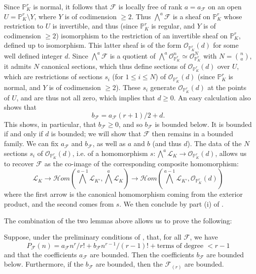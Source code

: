 \begin{cproof}
      Since $\mathbb{P}_K^r$ is normal, it follows that $\mathcal{F}$ is locally free of rank $a=a_\mathcal{F}$ on an open $U=\mathbb{P}_K^r\setminus Y$, where $Y$ is of codimension $\geqslant2$.
      Thus $\bigwedge^a\mathcal{F}$ is a sheaf on $\mathbb{P}_K^r$ whose restriction to $U$ is invertible, and thus (since $\mathbb{P}_K^r$ is regular, and $Y$ is of codimension $\geqslant2$) isomorphism to the restriction of an invertible sheaf on $\mathbb{P}_K^r$, defined up to isomorphism.
      This latter sheaf is of the form $\mathcal{O}_{\mathbb{P}_K^r}(d)$ for some well defined integer $d$.
      Since $\bigwedge^a\mathcal{F}$ is a quotient of $\bigwedge^a\mathcal{O}_{\mathbb{P}_K^r}^n\simeq\mathcal{O}_{\mathbb{P}_K^r}^N$ with $N=\binom{n}{a}$, it admits $N$ canonical sections, which thus define sections of $\mathcal{O}_{\mathbb{P}_K^r}(d)$ over $U$, which are restrictions of sections $s_i$ (for $1\leqslant i\leqslant N$) of $\mathcal{O}_{\mathbb{P}_K^r}(d)$ (since $\mathbb{P}_K^r$ is normal, and $Y$ is of codimension $\geqslant2$).
      These $s_i$ generate $\mathcal{O}_{\mathbb{P}_K^r}(d)$ at the points of $U$, and are thus not all zero, which implies that $d\geqslant0$.
      An easy calculation also shows that
      \[
        b_\mathcal{F}
        = a_\mathcal{F}(r+1)/2 + d.
      \]
      This shows, in particular, that $b_\mathcal{F}\geqslant0$, and so $b_\mathcal{F}$ is bounded below.
      It is bounded if and only if $d$ is bounded;
      we will show that $\mathcal{F}$ then remains in a bounded family.
      We can fix $a_\mathcal{F}$ and $b_\mathcal{F}$, as well as $a$ and $b$ (and thus $d$).
      The data of the $N$ sections $s_i$ of $\mathcal{O}_{\mathbb{P}_K^r}(d)$, i.e. of a homomorphism $s\colon\bigwedge^a\mathcal{L}_K\to\mathcal{O}_{\mathbb{P}_K^r}(d)$, allows us to recover $\mathcal{F}$ as the co-image of the corresponding composite homomorphism:
      \[
        \mathcal{L}_K
        \to \mathcal{H}om\left( \bigwedge^{a-1}\mathcal{L}_{K'}, \bigwedge^a\mathcal{L}_K \right)
        \to \mathcal{H}om\left( \bigwedge^{a-1}\mathcal{L}_{K'}, \mathcal{O}_{\mathbb{P}_K^r}(d) \right)
      \]
      where the first arrow is the canonical homomorphism coming from the exterior product, and the second comes from $s$.
      We then conclude by part (i) of .
  \end{cproof}


  The combination of the two lemmas above allows us to prove the following:


  \begin{lemma}\label{fga3.iv-2-lemma-2.6}
    Suppose, under the preliminary conditions of , that, for all $\mathcal{F}$, we have
    \[
      P_\mathcal{F}(n)
      = a_\mathcal{F} n^r/r! + b_\mathcal{F} n^{r-1}/(r-1)! + \text{terms of degree }<r-1
    \]
    and that the coefficients $a_\mathcal{F}$ are bounded.
    Then the coefficients $b_\mathcal{F}$ are bounded below.
    Furthermore, if the $b_\mathcal{F}$ are bounded, then the $\mathcal{F}_{(r)}$ are bounded.
  \end{lemma}

